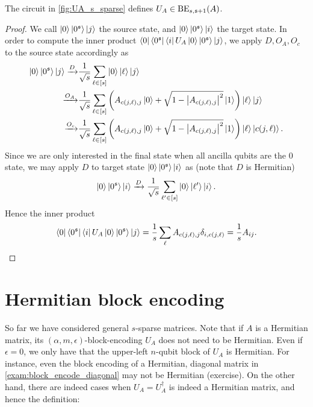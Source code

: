 \begin{prop}
The circuit in \cref{fig:UA_s_sparse} defines $U_A\in \operatorname{BE}_{s,\mathfrak{s}+1}(A)$. 
\end{prop}

\begin{proof}
We call $\ket{0}\ket{0^{\mathfrak{s}}}\ket{j}$ the source state, and $\ket{0}\ket{0^{\mathfrak{s}}}\ket{i}$ the target state. In order to compute the inner product $\bra{0}\bra{0^{\mathfrak{s}}}\bra{i} U_A \ket{0}\ket{0^{\mathfrak{s}}}\ket{j}$, we apply $D,O_A,O_c$ to the source state accordingly as
\begin{equation}
\begin{split}
\ket{0}\ket{0^{\mathfrak{s}}}\ket{j}\xrightarrow{D} & \frac{1}{\sqrt{s}}\sum_{\ell\in[s]} \ket{0}\ket{\ell}\ket{j}\\
\xrightarrow{O_A} & \frac{1}{\sqrt{s}}\sum_{\ell\in[s]} \left(A_{c(j,\ell),j}\ket{0}+\sqrt{1-\left\lvert A_{c(j,\ell),j}\right\rvert^2}\ket{1}\right)\ket{\ell}\ket{j}\\
\xrightarrow{O_c} & \frac{1}{\sqrt{s}}\sum_{\ell\in[s]} \left(A_{c(j,\ell),j}\ket{0}+\sqrt{1-\left\lvert A_{c(j,\ell),j}\right\rvert^2}\ket{1}\right)\ket{\ell}\ket{c(j,\ell)}.
\end{split}
\end{equation}
Since we are only interested in the final state when all ancilla qubits are the $0$ state, we may apply $D$ to target state $\ket{0}\ket{0^{\mathfrak{s}}}\ket{i}$ as (note that $D$ is Hermitian)
\begin{equation}
\ket{0}\ket{0^{\mathfrak{s}}}\ket{i}\xrightarrow{D}  \frac{1}{\sqrt{s}}\sum_{\ell'\in[s]} \ket{0}\ket{\ell'}\ket{i}.
\end{equation}
Hence the inner product
\begin{equation}
\bra{0}\bra{0^{\mathfrak{s}}}\bra{i} U_A \ket{0}\ket{0^{\mathfrak{s}}}\ket{j}=\frac{1}{s}\sum_{\ell}A_{c(j,\ell),j} \delta_{i,c(j,\ell)}=\frac{1}{s}A_{ij}.
\end{equation}
\end{proof}


\section{Hermitian block encoding}\label{sec:herm_be}

So far we have considered general $s$-sparse matrices. 
Note that if $A$ is a Hermitian matrix, its $(\alpha, m, \epsilon)$-block-encoding $U_A$ does not need to be Hermitian. 
Even if $\epsilon=0$, we only have that the upper-left $n$-qubit block of $U_A$ is Hermitian. 
For instance, even the block encoding of a Hermitian, diagonal matrix in \cref{exam:block_encode_diagonal} may not be Hermitian (exercise).
On the other hand, there are indeed cases when $U_A=U_A^{\dag}$ is indeed a Hermitian matrix, and hence the definition:


